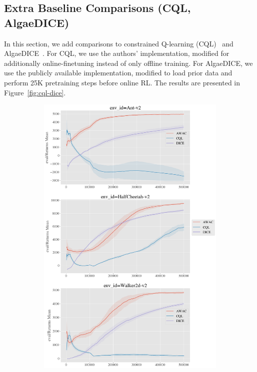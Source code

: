 \pagebreak

\subsection{Extra Baseline Comparisons (CQL, AlgaeDICE)}

In this section, we add comparisons to constrained Q-learning (CQL)~\citep{kumar2020cql} and AlgaeDICE~\citep{nachum2019dualdice}. For CQL, we use the authors' implementation, modified for additionally online-finetuning instead of only offline training. For AlgaeDICE, we use the publicly available implementation, modified to load prior data and perform 25K pretraining steps before online RL. The results are presented in Figure~\ref{fig:cql-dice}.

\begin{figure}[H]
    \centering
    \begin{subfigure}[b]{0.49\textwidth}
        \center
        \includegraphics[width=\textwidth]{awac/figures/iclrrebuttal/d4rl_mujoco_comparisons.png}

\end{subfigure}
\end{figure}
